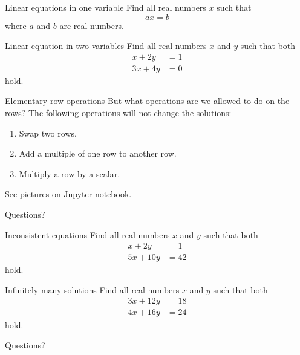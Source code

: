 \documentclass{beamer}
\begin{document}
\begin{frame}{Linear equations in one variable}
  Find all real numbers $x$ such that
  \begin{equation*}
    ax = b
  \end{equation*}
  where $a$ and $b$ are real numbers.
\end{frame}

\begin{frame}{Linear equation in two variables}
  Find all real numbers $x$ and $y$ such that both
  \begin{align*}
    x+2y&=1\\
    3x+4y&=0
  \end{align*}
  hold.
\end{frame}

\begin{frame}{Elementary row operations}
  But what operations are we allowed to do on the rows?\vfill
  The following operations will not change the solutions:-\vfill
  \begin{enumerate}
  \item Swap two rows.\vfill
  \item Add a multiple of one row to another row.\vfill
  \item Multiply a row by a scalar.\vfill
  \end{enumerate}
  See pictures on Jupyter notebook.
\end{frame}


\begin{frame}
  Questions?
\end{frame}


\begin{frame}{Inconsistent equations}
  Find all real numbers $x$ and $y$ such that both
  \begin{align*}
    x+2y&=1\\
    5x+10y&=42
  \end{align*}
  hold.
\end{frame}

\begin{frame}{Infinitely many solutions}
  Find all real numbers $x$ and $y$ such that both
  \begin{align*}
    3x+12y&=18\\
    4x+16y&=24
  \end{align*}
  hold.
\end{frame}

\begin{frame}
Questions?
\end{frame}
\end{document}
